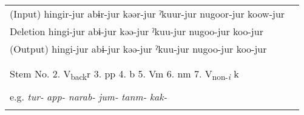 \begin{table}
\begin{tabular}{ll}
(Input)  hingir-jur  abɨr-jur  kəər-jur  ˀkuur-jur  nugoor-jur  koow-jur                                                                                                                                                                                      \\
Deletion  hingi-jur  abɨ-jur  kəə-jur  ˀkuu-jur  nugoo-jur  koo-jur                                                                                                                                                                                           \\
(Output)  hingi-jur  abɨ-jur  kəə-jur  ˀkuu-jur  nugoo-jur  koo-jur                                                                                                                                                                                           \\
                                                                                                                                                                                                                                                              \\
\tablevspace                                                                                                                                                                                                                                                  \\
Stem No.  2. V\textsubscript{back}r  3. pp  4. b  5. Vm  6. nm  7. V\textsubscript{non-}\textit{\textsubscript{i}} k                                                                                                                                          \\
                                                                                                                                                                                                                                                              \\
e.g.  \textit{tur-}  \textit{app-}  \textit{narab-}  \textit{jum-}  \textit{tanm-}  \textit{kak-}                                                                                                                                                             \\
                                                                                                                                                                                                                                                              \\

\end{tabular}
\end{table}
